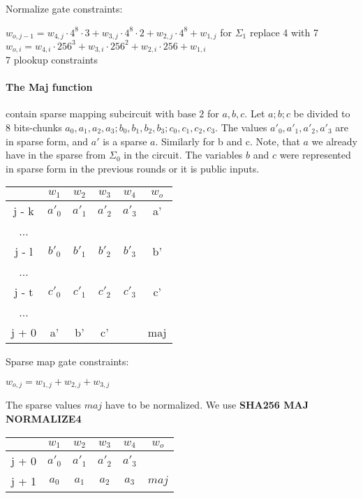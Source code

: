 Normalize gate constraints:
\begin{center}
$w_{o,j-1} = w_{4,j} \cdot 4^8 \cdot 3 + w_{3,j} \cdot 4^8 \cdot 2 + w_{2,j} \cdot 4^8 + w_{1,j}$ for $\Sigma_1$ replace 4 with 7\\
$w_{o,i} = w_{4,i} \cdot 256^3 + w_{3,i} \cdot 256^2 + w_{2,i} \cdot 256 + w_{1,i}$ \\
7 plookup constraints \\
\end{center}

\paragraph{The Maj function}
contain sparse mapping subcircuit with base $2$ for $a, b ,c$.
Let $a; b; c$ be divided to 8 bits-chunks $a_0, a_1, a_2, a_3; b_0, b_1, b_2, b_3; c_0, c_1, c_2, c_3$.
The values $a'_0, a'_1, a'_2, a'_3$ are in sparse form, and $a'$ is a sparse $a$.
Similarly for b and c. 
Note, that $a$ we already have in the sparse from $\Sigma_0$ in the circuit. 
The variables $b$ and $c$ were represented in sparse form in the previous rounds or it is public inputs.
\begin{center}
\begin{tabular}{ c|c|c|c|c|c } 
  & $w_1$ & $w_2$ & $w_3$ & $w_4$ & $w_o$\\ 
 \hline 
j - k & $a'_0$ & $a'_1$ & $a'_2$ & $a'_3$ & a' \\ 
... & & & & \\
j - l & $b'_0$ & $b'_1$ & $b'_2$ & $b'_3$ & b'\\ 
... & & & & \\
j - t & $c'_0$ & $c'_1$ & $c'_2$ & $c'_3$ & c' \\ 
... & & & & \\
j + 0 & a' & b' & c' & & maj \\
\end{tabular}
\end{center}
Sparse map gate constraints:
\begin{center}
$w_{o, j} = w_{1,j} + w_{2, j} + w_{3, j}$ \\
\end{center}

The sparse values $maj$ have to be normalized.
We use \textbf{SHA256 MAJ NORMALIZE4}
\begin{center}
\begin{tabular}{ c|c|c|c|c|c } 
  & $w_1$ & $w_2$ & $w_3$ & $w_4$ & $w_o$\\ 
 \hline
j + 0 & $a'_0$ & $a'_1$ & $a'_2$ & $a'_3$ &\\ 
j + 1 & $a_0$ & $ a_1$ & $a_2$ & $a_3$ &  $maj$ \\ 
\end{tabular}
\end{center}


